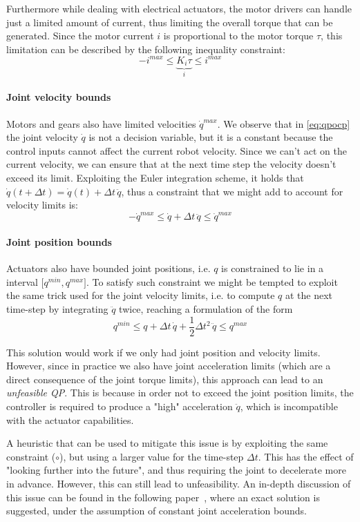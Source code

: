 	Furthermore while dealing with electrical actuators, the motor drivers can handle just a limited amount of current, thus limiting the overall torque that can be generated.
	Since the motor current $i$ is proportional to the motor torque $\tau$, this limitation can be described by the following inequality constraint:
	\[ -i^{max} \leq \underbrace{K_i \tau}_{i} \leq i^{max} \]
	
	\paragraph{Joint velocity bounds} Motors and gears also have limited velocities $\dot q^{max}$. We observe that in \eqref{eq:qpocp} the joint velocity $\dot q$ is not a decision variable, but it is a constant because the control inputs cannot affect the current robot velocity. 
	Since we can't act on the current velocity, we can ensure that at the next time step the velocity doesn't exceed its limit. 
	Exploiting the Euler integration scheme, it holds that $\dot q(t + \Delta t) = \dot q(t) + \Delta t \, \ddot q$, thus a constraint that we might add to account for velocity limits is:
	\[ -\dot q^{max} \leq \dot q + \Delta t \, \ddot q \leq \dot q^{max} \]
	
	\paragraph{Joint position bounds} Actuators also have bounded joint positions, i.e. $q $ is constrained to lie in a interval $\big[q^{min}, q^{max}\big]$. 
	To satisfy such constraint we might be tempted to exploit the same trick used for the joint velocity limits, i.e. to compute $q$ at the next time-step by integrating $\ddot q$ twice, reaching a formulation of the form
	\[ q^{min} \leq q + \Delta t\, \dot q + \frac 1 2 \Delta t^2 \, \ddot q \leq q^{max} \tag{$\circ$}\]
	
	This solution would work if we only had joint position and velocity limits. 
	However, since in practice we also have joint acceleration limits (which are a direct consequence of the joint torque limits), this approach can lead to an \textit{unfeasible QP}.
	This is because in order not to exceed the joint position limits, the controller is required to produce a "high" acceleration $\ddot q$, which is incompatible with the actuator capabilities.
	
	A heuristic that can be used to mitigate this issue is by exploiting the same constraint ($\circ$), but using a larger value for the time-step $\Delta t$.
	This has the effect of "looking further into the future", and thus requiring the joint to decelerate more in advance.
	However, this can still lead to unfeasibility.
	An in-depth discussion of this issue can be found in the following paper~\cite{DelPreteRAL2018}, where an exact solution is suggested, under the assumption of constant joint acceleration bounds.
	
